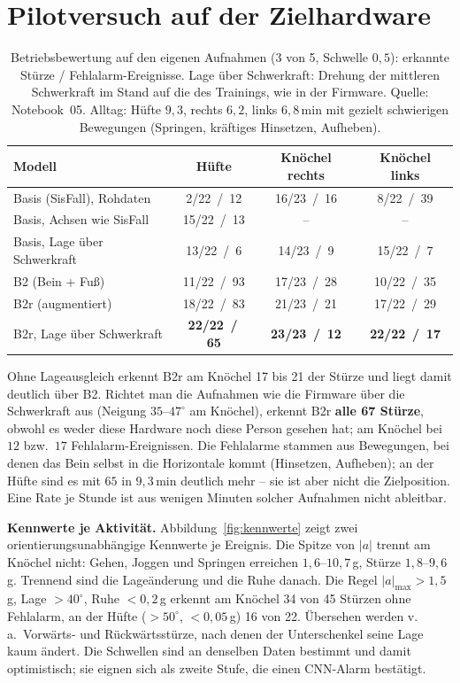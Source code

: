 \documentclass[11pt,a4paper,oneside,parskip=half,open=any,
               numbers=noenddot,listof=totoc,bibliography=totoc]{scrreprt}
\begin{document}
\section{Pilotversuch auf der Zielhardware}
\begin{table}[H]
\centering\small
\caption{Betriebsbewertung auf den eigenen Aufnahmen (3 von 5, Schwelle
$0{,}5$): erkannte Stürze / Fehlalarm-Ereignisse. \glqq Lage über
Schwerkraft\grqq: Drehung der mittleren Schwerkraft im Stand auf die des
Trainings, wie in der Firmware. Quelle: Notebook~05. Alltag:
Hüfte $9{,}3$, rechts $6{,}2$, links $6{,}8$\,min mit gezielt
schwierigen Bewegungen (Springen, kräftiges Hinsetzen, Aufheben).}
\label{tab:pilot}
\begin{tabularx}{\textwidth}{Y c c c}
\toprule
\textbf{Modell} & \textbf{Hüfte} & \textbf{Knöchel rechts} & \textbf{Knöchel links} \\
\midrule
Basis (SisFall), Rohdaten          & 2/22 \,/\, 12  & 16/23 \,/\, 16 & 8/22 \,/\, 39 \\
Basis, Achsen wie SisFall          & 15/22 \,/\, 13 & -- & -- \\
Basis, Lage über Schwerkraft       & 13/22 \,/\, 6  & 14/23 \,/\, 9  & 15/22 \,/\, 7 \\
B2 (Bein + Fuß)                    & 11/22 \,/\, 93 & 17/23 \,/\, 28 & 10/22 \,/\, 35 \\
B2r (augmentiert)                  & 18/22 \,/\, 83 & 21/23 \,/\, 21 & 17/22 \,/\, 29 \\
B2r, Lage über Schwerkraft         & \textbf{22/22 \,/\, 65} & \textbf{23/23 \,/\, 12} & \textbf{22/22 \,/\, 17} \\
\bottomrule
\end{tabularx}
\end{table}

Ohne Lageausgleich erkennt B2r am Knöchel 17 bis 21 der Stürze und
liegt damit deutlich über B2. Richtet man die Aufnahmen wie die Firmware
über die Schwerkraft aus (Neigung $35$--$47^{\circ}$ am Knöchel), erkennt
B2r \textbf{alle 67 Stürze}, obwohl es weder diese Hardware noch diese
Person gesehen hat; am Knöchel bei $12$ bzw.\ $17$ Fehlalarm-Ereignissen.
Die Fehlalarme stammen aus Bewegungen, bei denen das Bein selbst in die
Horizontale kommt (Hinsetzen, Aufheben); an der Hüfte sind es mit $65$
in $9{,}3$\,min deutlich mehr -- sie ist aber nicht die Zielposition.
Eine Rate je Stunde ist aus wenigen Minuten solcher Aufnahmen nicht
ableitbar.

\textbf{Kennwerte je Aktivität.} Abbildung~\ref{fig:kennwerte} zeigt zwei
orientierungsunabhängige Kennwerte je Ereignis. Die Spitze von $|a|$
trennt am Knöchel nicht: Gehen, Joggen und Springen erreichen
$1{,}6$--$10{,}7$\,g, Stürze $1{,}8$--$9{,}6$\,g. Trennend sind die
Lageänderung und die Ruhe danach. Die Regel $|a|_{\max} > 1{,}5$\,g,
Lage $> 40^{\circ}$, Ruhe $< 0{,}2$\,g erkennt am Knöchel 34 von 45
Stürzen ohne Fehlalarm, an der Hüfte ($> 50^{\circ}$, $< 0{,}05$\,g) 16
von 22. Übersehen werden v.\,a.\ Vorwärts- und Rückwärtsstürze, nach
denen der Unterschenkel seine Lage kaum ändert. Die Schwellen sind an
denselben Daten bestimmt und damit optimistisch; sie eignen sich als
zweite Stufe, die einen CNN-Alarm bestätigt.
\end{document}
